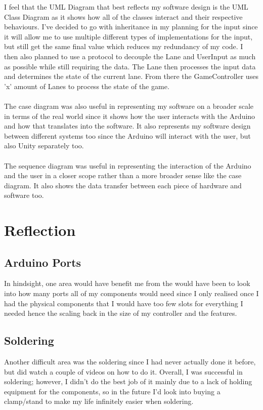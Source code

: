 \documentclass{article}
\begin{document}
I feel that the UML Diagram that best reflects my software design is the UML Class Diagram as it shows how all of the classes interact and their respective behaviours. I've decided to go with inheritance in my planning for the input since it will allow me to use multiple different types of implementations for the input, but still get the same final value which reduces my redundancy of my code. I then also planned to use a protocol to decouple the Lane and UserInput as much as possible while still requiring the data. The Lane then processes the input data and determines the state of the current lane. From there the GameController uses 'x' amount of Lanes to process the state of the game.
\\
\\
The case diagram was also useful in representing my software on a broader scale in terms of the real world since it shows how the user interacts with the Arduino and how that translates into the software. It also represents my software design between different systems too since the Arduino will interact with the user, but also Unity separately too.
\\
\\
The sequence diagram was useful in representing the interaction of the Arduino and the user in a closer scope rather than a more broader sense like the case diagram. It also shows the data transfer between each piece of hardware and software too.

\section{Reflection}

\subsection{Arduino Ports}
In hindsight, one area would have benefit me from the would have been to look into how many ports all of my components would need since I only realised once I had the physical components that I would have too few slots for everything I needed hence the scaling back in the size of my controller and the features.
\\

\subsection{Soldering}
Another difficult area was the soldering since I had never actually done it before, but did watch a couple of videos on how to do it. Overall, I was successful in soldering; however, I didn't do the best job of it mainly due to a lack of holding equipment for the components, so in the future I'd look into buying a clamp/stand to make my life infinitely easier when soldering.
\\
\end{document}
